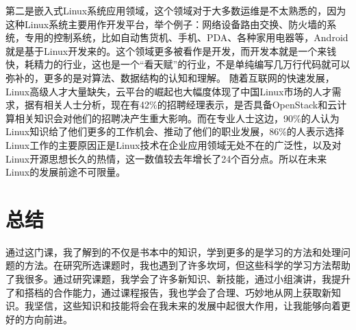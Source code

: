 \documentclass{article}
\begin{document}
第二是嵌入式Linux系统应用领域，这个领域对于大多数运维是不太熟悉的，因为这种Linux系统主要用作开发平台，举个例子：网络设备路由交换、防火墙的系统，专用的控制系统，比如自动售货机、手机、PDA、各种家用电器等，Android就是基于Linux开发来的。这个领域更多被看作是开发，而开发本就是一个来钱快，耗精力的行业，这也是一个“看天赋”的行业，不是单纯编写几万行代码就可以弥补的，更多的是对算法、数据结构的认知和理解。
随着互联网的快速发展，Linux高级人才大量缺失，云平台的崛起也大幅度体现了中国Linux市场的人才需求，据有相关人士分析，现在有42\%的招聘经理表示，是否具备OpenStack和云计算相关知识会对他们的招聘决产生重大影响。而在专业人士这边，90\%的人认为Linux知识给了他们更多的工作机会、推动了他们的职业发展，86\%的人表示选择Linux工作的主要原因正是Linux技术在企业应用领域无处不在的广泛性，以及对Linux开源思想长久的热情，这一数值较去年增长了24个百分点。所以在未来Linux的发展前途不可限量。

\section{总结}\par
通过这门课，我了解到的不仅是书本中的知识，学到更多的是学习的方法和处理问题的方法。在研究所选课题时，我也遇到了许多坎坷，但这些科学的学习方法帮助了我很多。通过研究课题，我学会了许多新知识、新技能，通过小组演讲，我提升了和搭档的合作能力，通过课程报告，我也学会了合理、巧妙地从网上获取新知识。我坚信，这些知识和技能将会在我未来的发展中起很大作用，让我能够向着更好的方向前进。
\end{document}
